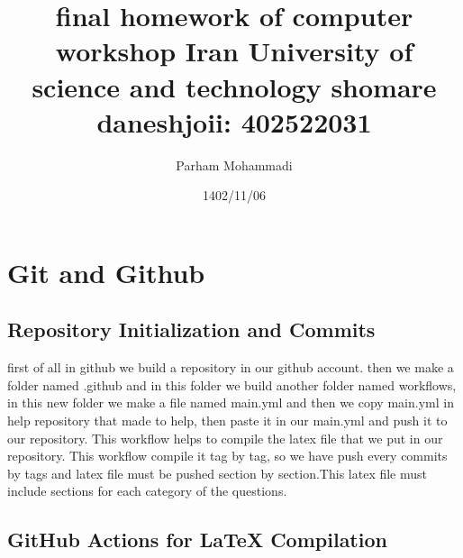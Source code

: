 \documentclass[titlepage]{article}
\title{ \textbf{final homework of computer workshop} \newline Iran University of science and technology \newline \newline shomare daneshjoii: 402522031}
\author{Parham Mohammadi }
\date{1402/11/06}
\begin{document}
\maketitle

\pagestyle{fancy}
\fancyhead[R]{}

\tableofcontents
\newpage
{}
\fancyhead[R]{}
\section{Git and Github}
\subsection{ Repository Initialization and Commits}
first of all in github we build a repository in our github account. then we make a folder named .github and in this folder we build another folder named workflows, in this new folder we make a file named main.yml and then we copy main.yml in help repository that made to help, then paste it in our main.yml and push it to our repository. This workflow helps to compile the latex file that we put in our repository. This workflow compile it tag by tag, so we have push every commits by tags and latex file must be pushed section by section.This latex file must include  sections for each category of the questions.
\subsection{ GitHub Actions for LaTeX Compilation}
\end{document}
